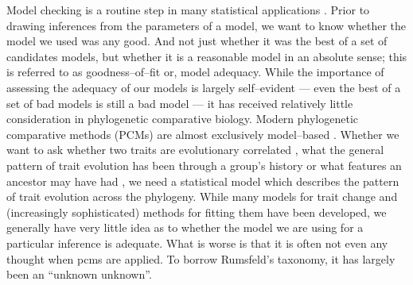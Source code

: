 \documentclass[a4paper,12pt]{article}
\begin{document}
\noindent Model checking is a routine step in many statistical applications \citep[e.g.][ch. 6]{Gelmanbook}. Prior to drawing inferences from the parameters of a model, we want to know whether the model we used was any good. And not just whether it was the best of a set of candidates models, but whether it is a reasonable model in an absolute sense; this is referred to as goodness--of--fit or, model adequacy. While the importance of assessing the adequacy of our models is largely self--evident --- even the best of a set of bad models is still a bad model --- it has received relatively little consideration in phylogenetic comparative biology. Modern phylogenetic comparative methods (PCMs) are almost exclusively model--based \citep[recently reviewed in][]{Omeara2012, PennellHarmon}. Whether we want to ask whether two traits are evolutionary correlated \citep[e.g.][]{Felsenstein1985, Grafen1989, HarveyPagel1991}, what the general pattern of trait evolution has been through a group's history \citep[e.g.][]{Mooers1999, Harmon2010, Hunt2012} or what features an ancestor may have had \citep[e.g.][]{Schluter1997, Huelsenbeck2003}, we need a statistical model which describes the pattern of trait evolution across the phylogeny. While many models for trait change and (increasingly sophisticated) methods for fitting them have been developed, we generally have very little idea as to whether the model we are using for a particular inference is adequate. What is worse is that it is often not even any thought when pcms are applied. To borrow Rumsfeld's taxonomy, it has largely been an ``unknown unknown''.
\end{document}
